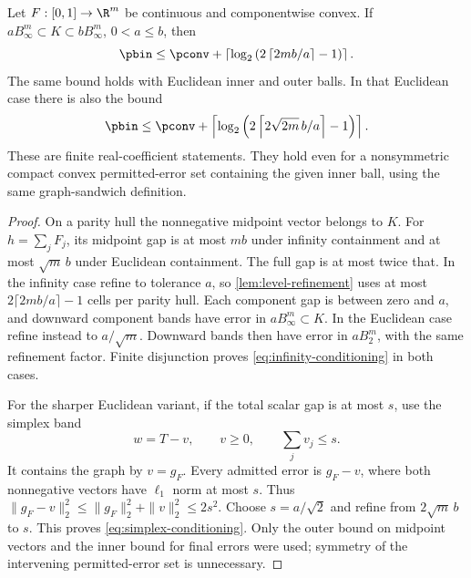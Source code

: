 \begin{proposition}\label{prop:conditioning}
Let $F:[0,1]\to\R^m$ be continuous and componentwise convex.
If $aB_\infty^m\subset K\subset bB_\infty^m$, $0<a\le b$, then
\begin{equation}\label{eq:infinity-conditioning}
 \pbin\le\pconv+
 \left\lceil\log_2\left(2\left\lceil2mb/a\right\rceil-1\right)\right\rceil.
\end{equation}
The same bound holds with Euclidean inner and outer balls. In that
Euclidean case there is also the bound
\begin{equation}\label{eq:simplex-conditioning}
 \pbin\le\pconv+
 \left\lceil\log_2\left(2\left\lceil2\sqrt{2m}\,b/a\right\rceil-1\right)\right\rceil.
\end{equation}
These are finite real-coefficient statements. They hold even for a
nonsymmetric compact convex permitted-error set containing the given
inner ball, using the same graph-sandwich definition.
\end{proposition}
\begin{proof}
On a parity hull the nonnegative midpoint vector belongs to $K$.
For $h=\sum_jF_j$, its midpoint gap is at most $mb$ under infinity
containment and at most $\sqrt m\,b$ under Euclidean containment.
The full gap is at most twice that. In the infinity case refine to
tolerance $a$, so \cref{lem:level-refinement} uses at most
$2\lceil2mb/a\rceil-1$ cells per parity hull. Each component gap
is between zero and $a$, and downward component bands have error in
$aB_\infty^m\subset K$. In the Euclidean case refine instead to
$a/\sqrt m$. Downward bands then have error in $aB_2^m$, with the
same refinement factor. Finite disjunction proves
\eqref{eq:infinity-conditioning} in both cases.

For the sharper Euclidean variant, if the total scalar gap is at most
$s$, use the simplex band
\begin{equation}\label{eq:simplex-band}
 w=T-v,\qquad v\ge0,\qquad \sum_jv_j\le s.
\end{equation}
It contains the graph by $v=g_F$. Every admitted error is $g_F-v$,
where both nonnegative vectors have $\ell_1$ norm at most $s$.
Thus $\|g_F-v\|_2^2\le\|g_F\|_2^2+\|v\|_2^2\le2s^2$.
Choose $s=a/\sqrt2$ and refine from $2\sqrt m\,b$ to $s$.
This proves \eqref{eq:simplex-conditioning}. Only the outer bound
on midpoint vectors and the inner bound for final errors were used;
symmetry of the intervening permitted-error set is unnecessary.
\end{proof}

